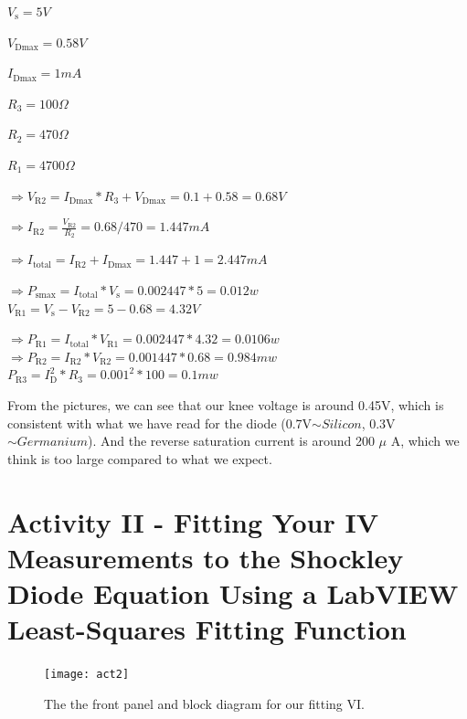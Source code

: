 \documentclass[11pt]{article}
\begin{document}
$V_{\mathrm {s} }=5 V$

$V_{\mathrm {Dmax} }=0.58 V$

$I_{\mathrm {Dmax} }=1 mA$

$R_{\mathrm {3} }=100 \Omega$

$R_{\mathrm {2} }=470 \Omega$

$R_{\mathrm {1} }=4700 \Omega$

$\Rightarrow V_{\mathrm {R2} }=I_{\mathrm {Dmax} }*R_{\mathrm {3} }+V_{\mathrm {Dmax} }=0.1+0.58=0.68 V$

$\Rightarrow I_{\mathrm {R2} }={\frac {V_{\mathrm {R2} }}{R_{\mathrm {2} }}}=0.68/470=1.447 mA $

$\Rightarrow I_{\mathrm {total} }=I_{\mathrm {R2} }+I_{\mathrm {Dmax} }=1.447+1=2.447 mA $

$\Rightarrow P_{\mathrm {smax} }=I_{\mathrm {total} }*V_{\mathrm {s} }=0.002447*5=0.012 w $ \\[1em]

$ V_{\mathrm {R1} }=V_{\mathrm {s} }-V_{\mathrm {R2} }=5-0.68=4.32 V $

$\Rightarrow P_{\mathrm {R1} }=I_{\mathrm {total} }*V_{\mathrm {R1} }=0.002447*4.32=0.0106 w $ \\[1em]

$\Rightarrow P_{\mathrm {R2} }=I_{\mathrm {R2} }*V_{\mathrm {R2} }=0.001447*0.68=0.984 mw $ \\[1em]

$P_{\mathrm {R3} }=I_{\mathrm {D} }^2*R_{\mathrm {3} }=0.001^2*100=0.1 mw $

From the pictures, we can see that our knee voltage is around 0.45V, which is consistent with what we have read for the diode (0.7V$\sim{Silicon}$, 0.3V$\sim{Germanium}$). And the reverse saturation current is around 200 $\mu$ A, which we think is too large compared to what we expect.



\section{Activity II - Fitting Your IV Measurements to the Shockley Diode Equation Using a LabVIEW Least-Squares Fitting Function}


\begin{figure}[H]
 \begin{center}
  \texttt{[image: act2]}
  \caption{The the front panel and block diagram for our fitting VI.}
  \label{fig:act2}
 \end{center}
\end{figure}
\end{document}
